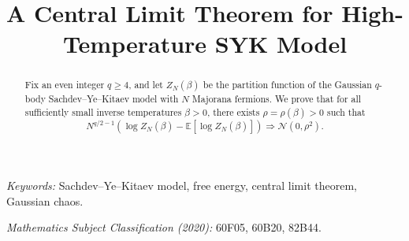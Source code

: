 \documentclass[11pt]{article}
\title{A Central Limit Theorem for High-Temperature SYK
Model}
\author{}
\date{}
\theoremstyle{remark}
\newcommand{\E}{\mathbb E}
\newcommand{\N}{\mathcal N}
\begin{document}
\maketitle

\begin{abstract}
Fix an even integer $q\geq4$, and let $Z_N(\beta)$ be the
partition function of the Gaussian $q$-body Sachdev--Ye--Kitaev model with $N$
Majorana fermions.  We prove that for all sufficiently small inverse temperatures
$\beta > 0$, there exists $\rho=\rho(\beta)>0$ such that
\[
N^{q/2 -1}(\log Z_N(\beta)-\E[\log Z_N(\beta)])
  \Longrightarrow \N(0,\rho^2).
\]
\end{abstract}

\noindent\emph{Keywords:} Sachdev--Ye--Kitaev model,
free energy, central limit theorem, Gaussian chaos.

\medskip
\noindent\emph{Mathematics Subject Classification (2020):}
60F05, 60B20, 82B44.
\end{document}
